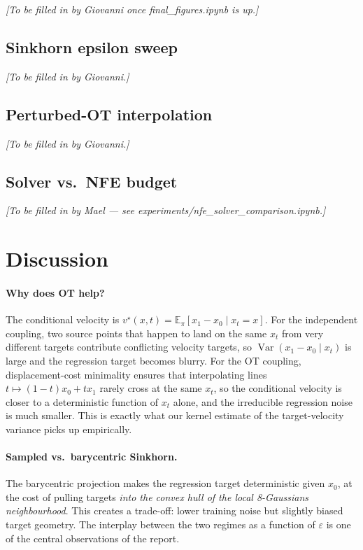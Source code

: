 \documentclass[11pt,a4paper]{article}
\newcommand{\E}{\mathbb{E}}
\DeclareMathOperator{\Var}{Var}
\begin{document}
\textit{[To be filled in by Giovanni once final\_figures.ipynb is up.]}

\subsection{Sinkhorn epsilon sweep}

\textit{[To be filled in by Giovanni.]}

\subsection{Perturbed-OT interpolation}

\textit{[To be filled in by Giovanni.]}

\subsection{Solver vs.\ NFE budget}

\textit{[To be filled in by Mael --- see experiments/nfe\_solver\_comparison.ipynb.]}

\section{Discussion}
\label{sec:discussion}

\paragraph{Why does OT help?}
The conditional velocity is $v^\star(x, t) = \E_\pi[x_1 - x_0 \mid x_t = x]$.
For the independent coupling, two source points that happen to land on the same
$x_t$ from very different targets contribute conflicting velocity targets, so
$\Var(x_1 - x_0 \mid x_t)$ is large and the regression target becomes blurry.
For the OT coupling, displacement-cost minimality ensures that interpolating
lines $t \mapsto (1-t)x_0 + t x_1$ rarely cross at the same $x_t$, so the
conditional velocity is closer to a deterministic function of $x_t$ alone, and
the irreducible regression noise is much smaller.  This is exactly what our
kernel estimate of the target-velocity variance picks up empirically.

\paragraph{Sampled vs.\ barycentric Sinkhorn.}  The barycentric projection makes
the regression target deterministic given $x_0$, at the cost of pulling targets
\emph{into the convex hull of the local 8-Gaussians neighbourhood}.  This
creates a trade-off: lower training noise but slightly biased target geometry.
The interplay between the two regimes as a function of $\varepsilon$ is one of
the central observations of the report.
\end{document}

